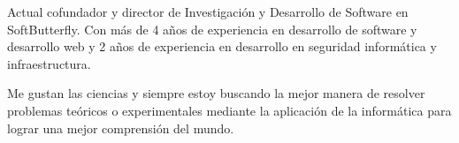 

\begin{cvparagraph}

Actual cofundador y director de Investigación y Desarrollo de Software en
SoftButterfly. Con más de 4 años de experiencia en desarrollo de software y
desarrollo web y 2 años de experiencia en desarrollo en seguridad informática
y infraestructura.

Me gustan las ciencias y siempre estoy buscando la mejor manera de resolver
problemas teóricos o experimentales mediante la aplicación de la informática
para lograr una mejor comprensión del mundo.
\end{cvparagraph}
